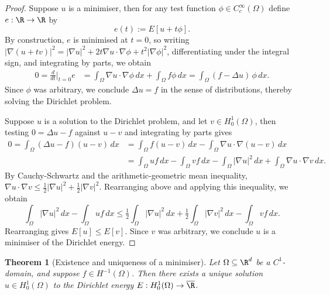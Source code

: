 \documentclass[reqno]{amsart}
\newtheorem{theorem}{Theorem}
\theoremstyle{definition}
\theoremstyle{remark}
\begin{document}
\begin{proof}
	Suppose $u$ is a minimiser, then for any test function $\phi \in C^\infty_c (\Omega)$ define $e: \R \to \R$ by
		\[ e(t) := E[u + t\phi]. \]
	By construction, $e$ is minimised at $t = 0$, so writing $|\nabla (u + tv)|^2 = |\nabla u|^2 + 2t \nabla u \cdot \nabla \phi + t^2 |\nabla \phi|^2$, differentiating under the integral sign, and integrating by parts, we obtain 
		\begin{align*}
			0
				= \frac{d}{dt} \Big|_{t = 0} e 
				&= \int_\Omega \nabla u \cdot \nabla \phi \, dx + \int_\Omega f \phi\, dx = \int_\Omega (f- \Delta u) \, \phi \, dx.
		\end{align*}	
	Since $\phi$ was arbitrary, we conclude $\Delta u = f$ in the sense of distributions, thereby solving the Dirichlet problem. 
	
	Suppose $u$ is a solution to the Dirichlet problem, and let $v \in H^1_0 (\Omega)$, then testing $0 = \Delta u - f$ against $u - v$ and integrating by parts gives
		\begin{align*}
			 0 = \int_\Omega (\Delta u - f) (u - v) \, dx 
				&= \int_\Omega f ( u - v) \, dx - \int_\Omega \nabla u \cdot \nabla (u - v) \, dx \\
				&= \int_\Omega u f \, dx - \int_\Omega v f \, dx - \int_\Omega |\nabla u|^2 \, dx + \int_\Omega \nabla u \cdot \nabla v \, dx.
		\end{align*}		
	By Cauchy-Schwartz and the arithmetic-geometric mean inequality, $\nabla u \cdot \nabla v \leq \tfrac12 |\nabla u|^2 + \tfrac12 |\nabla v|^2$. Rearranging above and applying this inequality, we obtain
		\[ \int_\Omega |\nabla u|^2 \, dx - \int_\Omega uf \, dx \leq \tfrac12 \int_\Omega |\nabla u|^2 \, dx + \tfrac12 \int_\Omega |\nabla v|^2 \, dx - \int_\Omega v f \, dx.  \]	
	Rearranging gives $E[u] \leq E[v]$. Since $v$ was arbitrary, we conclude $u$ is a minimiser of the Dirichlet energy. 	
\end{proof}

\begin{theorem}[Existence and uniqueness of a minimiser]
	Let $\Omega \subseteq \R^d$ be a $C^1$-domain, and suppose $f \in H^{-1} (\Omega)$. Then there exists a unique solution $u \in H^1_0 (\Omega)$ to the Dirichlet energy $E: H^1_0(\Omega) \to \overline \R$. 
\end{theorem}
\end{document}
